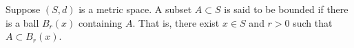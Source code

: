 Suppose $(S, d)$ is a metric space. A subset $A \subset S$ is said to be bounded if there is a ball $B_r(x)$ containing $A$. That is, there exist $x \in S$ and $r > 0$ such that $A \subset B_r(x)$.
